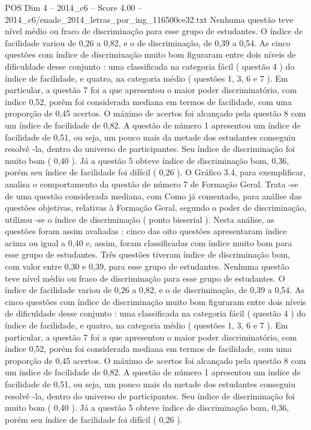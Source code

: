 \begin{textsample}{POS Dim 4 – 2014\_c6 – Score 4.00 – 2014\_c6/enade\_2014\_letras\_por\_ing\_116500ce32.txt}
Nenhuma questão teve nível médio ou fraco de discriminação para esse grupo de estudantes.
O índice de facilidade variou de 0,26 a 0,82, e o de discriminação, de 0,39 a 0,54.
As cinco questões com índice de discriminação muito bom figuraram entre dois níveis de dificuldade desse conjunto : uma classificada na categoria fácil ( questão 4 ) do índice de facilidade, e quatro, na categoria médio ( questões 1, 3, 6 e 7 ).
Em particular, a questão 7 foi a que apresentou o maior poder discriminatório, com índice 0,52, porém foi considerada mediana em termos de facilidade, com uma proporção de 0,45 acertos.
O máximo de acertos foi alcançado pela questão 8 com um índice de facilidade de 0,82.
A questão de número 1 apresentou um índice de facilidade de 0,51, ou seja, um pouco mais da metade dos estudantes conseguiu resolvê -la, dentro do universo de participantes.
Seu índice de discriminação foi muito bom ( 0,40 ).
Já a questão 5 obteve índice de discriminação bom, 0,36, porém seu índice de facilidade foi difícil ( 0,26 ).
O Gráfico 3.4, para exemplificar, analisa o comportamento da questão de número 7 de Formação Geral.
Trata -se de uma questão considerada mediana, com Como já comentado, para análise das questões objetivas, relativas à Formação Geral, segundo o poder de discriminação, utilizou -se o índice de discriminação ( ponto bisserial ).
Nesta análise, as questões foram assim avaliadas : cinco das oito questões apresentaram índice acima ou igual a 0,40 e, assim, foram classificadas com índice muito bom para esse grupo de estudantes.
Três questões tiveram índice de discriminação bom, com valor entre 0,30 e 0,39, para esse grupo de estudantes.
Nenhuma questão teve nível médio ou fraco de discriminação para esse grupo de estudantes.
O índice de facilidade variou de 0,26 a 0,82, e o de discriminação, de 0,39 a 0,54.
As cinco questões com índice de discriminação muito bom figuraram entre dois níveis de dificuldade desse conjunto : uma classificada na categoria fácil ( questão 4 ) do índice de facilidade, e quatro, na categoria médio ( questões 1, 3, 6 e 7 ).
Em particular, a questão 7 foi a que apresentou o maior poder discriminatório, com índice 0,52, porém foi considerada mediana em termos de facilidade, com uma proporção de 0,45 acertos.
O máximo de acertos foi alcançado pela questão 8 com um índice de facilidade de 0,82.
A questão de número 1 apresentou um índice de facilidade de 0,51, ou seja, um pouco mais da metade dos estudantes conseguiu resolvê -la, dentro do universo de participantes.
Seu índice de discriminação foi muito bom ( 0,40 ).
Já a questão 5 obteve índice de discriminação bom, 0,36, porém seu índice de facilidade foi difícil ( 0,26 ).

\end{textsample}
